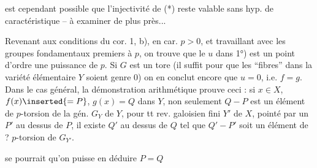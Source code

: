 est cependant possible que l'injectivité de (*) reste valable sans hyp. de caractéristique -- à examiner de plus près...

Revenant aux conditions du cor. 1, b), en car. $p>0$, et travaillant avec les groupes fondamentaux premiers à $p$, on trouve que le $u$ dans 1°) est un point  d'ordre une puissance de $p$. Si $G$ est un tore (il suffit pour  que les ``fibres'' dans la variété élémentaire $Y$ soient  genre 0) on en conclut encore que $u=0$, i.e. $f=g$. Dans le cas général, la démonstration arithmétique prouve  ceci : si $x\in X$,   $f(x)\inserted{=P}$, $g(x)=Q$ dans $Y$, non seulement $Q-P$ est un élément de $p$-torsion de la  gén. $G_Y$ de $Y$, pour tt rev.  galoisien fini $Y'$ de $X$,  pointé par un $P'$ au dessus de $P$, il existe $Q'$ au dessus de $Q$ tel que $Q'-P'$ soit un élément de ? $p$-torsion de $G_{Y'}$.

 se pourrait qu'on puisse en déduire $P=Q$

